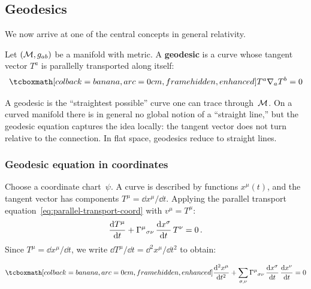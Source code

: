 \subsection{Geodesics}\label{sec:geodesics}

We now arrive at one of the central concepts in general
relativity.

\begin{definition}[Geodesic]\label{def:geodesic}
  Let $(\mathcal{M}, g_{ab})$ be a manifold with metric.  A
  \textbf{geodesic} is a curve whose tangent vector $T^a$ is
  parallelly transported along itself:
  \begin{equation}\label{eq:geodesic-abstract}
    \eqbox{T^a \covd_a T^b = 0}
  \end{equation}
\end{definition}

\begin{intuition}
  A geodesic is the ``straightest possible'' curve one can
  trace through~$\mathcal{M}$.  On a curved manifold there is in general
  no global notion of a ``straight line,'' but the geodesic
  equation captures the idea locally: the tangent vector does
  not turn relative to the connection.  In flat space, geodesics
  reduce to straight lines.
\end{intuition}



\subsubsection{Geodesic equation in coordinates}%
\label{sec:geodesic-coords}

Choose a coordinate chart~$\psi$.  A curve is described by
functions $x^\mu(t)$, and the tangent vector has components
$T^\mu = \dd x^\mu/\dd t$.  Applying the parallel transport
equation~\eqref{eq:parallel-transport-coord} with
$v^\mu = T^\mu$:
\[
  \frac{\mathrm{d} T^\mu}{\mathrm{d} t}
    + \Gamma^{\mu}{}_{\sigma\nu}\,
      \frac{\mathrm{d} x^\sigma}{\mathrm{d} t}\,
      T^\nu = 0\,.
\]
Since $T^\mu = \dd x^\mu/\dd t$, we write
$\dd T^\mu/\dd t = \dd^2 x^\mu/\dd t^2$ to obtain:

\begin{equation}\label{eq:geodesic-coord}
  \eqbox{\frac{\dd^2 x^\mu}{\dd t^2}
    + \sum_{\sigma,\nu}
      \chris{\mu}{\sigma\nu}\,
      \frac{\dd x^\sigma}{\dd t}\,
      \frac{\dd x^\nu}{\dd t}
    = 0}
\end{equation}

